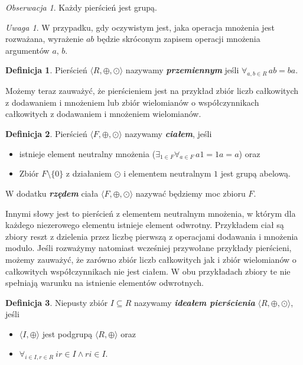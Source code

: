 \documentclass[polish,declaration,shortabstract]{iithesis}
\theoremstyle{definition}
\newtheorem{definition}{Definicja}
\theoremstyle{remark} \newtheorem{observation}{Obserwacja}
\theoremstyle{plain} \newtheorem{theorem}{Twierdzenie}
\theoremstyle{plain} \newtheorem{lemma}{Lemat}
\theoremstyle{remark} \newtheorem*{remark*}{Uwaga}
\theoremstyle{reminder} \newtheorem*{reminder*}{Przypomnienie}
\begin{document}
\theoremstyle{observation}
\begin{observation}
	Każdy pierścień jest grupą.
\end{observation}

\begin{remark*}
	W przypadku, gdy oczywistym jest, jaka operacja mnożenia jest rozważana, wyrażenie $ab$ będzie skróconym zapisem operacji mnożenia argumentów $a, \,b$.
\end{remark*}

\theoremstyle{definition}
\begin{definition}
	Pierścień $\langle R, \oplus, \odot \rangle$ nazywamy \textit{\textbf{przemiennym}} jeśli $\forall_{a, b \in R} \, ab = ba$.
\end{definition}

Możemy teraz zauważyć, że pierścieniem jest na przykład zbiór liczb całkowitych z dodawaniem i mnożeniem lub zbiór wielomianów o współczynnikach całkowitych z dodawaniem i mnożeniem wielomianów.

\theoremstyle{definition} 
\begin{definition} \label{cialo}
	Pierścień $\langle F, \oplus, \odot \rangle$ nazywamy \textit{\textbf{ciałem}}, jeśli 
	\begin{itemize}[leftmargin=.4in]
		\item istnieje element neutralny mnożenia ($\exists_{1 \in F} \forall_{a \in F} \, a1 = 1a = a$) oraz
		\item Zbiór $F \setminus \{0\}$ z działaniem $\odot$ i elementem neutralnym $1$ jest grupą abelową.
    \end{itemize}
    W dodatku \textbf{\textit{rzędem}} ciała $\langle F, \oplus, \odot \rangle$ nazywać będziemy moc zbioru $F$.
\end{definition}

Innymi słowy jest to pierścień z elementem neutralnym mnożenia, w którym dla każdego niezerowego elementu istnieje element odwrotny. Przykładem ciał są zbiory reszt z dzielenia przez liczbę pierwszą z operacjami dodawania i mnożenia modulo. Jeśli rozważymy natomiast wcześniej przywołane przykłady pierścieni, możemy zauważyć, że zarówno zbiór liczb całkowitych jak i zbiór wielomianów o całkowitych współczynnikach nie jest ciałem. W obu przykładach zbiory te nie spełniają warunku na istnienie elementów odwrotnych.

\theoremstyle{definition}
\begin{definition}
	Niepusty zbiór $I \subseteq R$ nazywamy \textbf{\textit{ideałem pierścienia}} $\langle R, \oplus, \odot \rangle$, jeśli
	\begin{itemize}[leftmargin=.5in]
		\item $\langle I, \oplus \rangle$ jest podgrupą $\langle R, \oplus \rangle$ oraz
		\item $\forall_{i \in I, r \in R} \: ir \in I \wedge ri \in I $.
	\end{itemize}
\end{definition}
\end{document}
